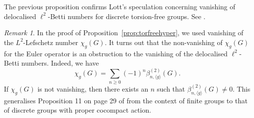 \documentclass[a4paper,leqno,12pt]{article}
\numberwithin{equation}{section}
\theoremstyle{plain}
\theoremstyle{definition}
\theoremstyle{remark}
\newtheorem{remark}[theoremcounter]{Remark}
\newcommand{\Csr}{\mathrm{C}^*_{\text{red}}}
\begin{document}
    
	The previous proposition confirms Lott's speculation concerning vanishing of delocalised $\ell^2$-Betti numbers for discrete torsion-free groups. See \cite[page 6]{lott1999}. 
	
	\begin{remark}
		In the proof of Proposition~\ref{prop:torfreehyper}, we used vanishing of the $L^2$-Lefschetz number $\chi_g(G)$. It turns out that the non-vanishing of $\chi_g(G)$ for the Euler operator is an obstruction to the vanishing of the delocalised $\ell^2$-Betti numbers. Indeed, we have 
		\[
		\chi_g(G)=\sum_{n\ge 0}(-1)^n\beta^{(2)}_{n, \langle g\rangle}(G). 
		\]  
		If $\chi_g(G)$ is not vanishing, then there exists an $n$ such that $\beta^{(2)}_{n, \langle g\rangle}(G)\neq 0$.
		This generalises Proposition 11 on page 29 of \cite{lott1999} from the context of finite groups to that of  discrete groups with proper cocompact action. 
	\end{remark}
	
\end{document}
